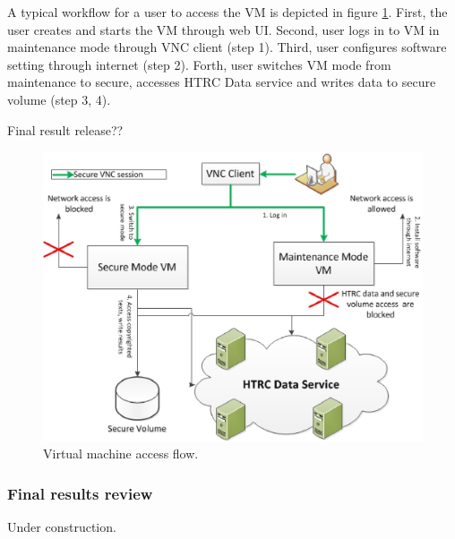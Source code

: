 \documentclass{acm_proc_article-sp}
\begin{document}
A typical workflow for a user to access the VM is depicted in figure \ref{fig:vmaccess}. First, the user creates and starts the VM through web UI. Second, user logs in to VM in maintenance mode through VNC client (step 1). Third, user configures software setting through internet (step 2). Forth, user switches VM mode from maintenance to secure, accesses HTRC Data service and writes data to secure volume (step 3, 4).

Final result release??

\begin{figure}[ht]
  \centering
  \includegraphics[scale=0.45]{figures/workflow-HTRCData}
  \caption{Virtual machine access flow.}
  \label{fig:vmaccess}
\end{figure}


\subsubsection{Final results review}


Under construction.
\end{document}
